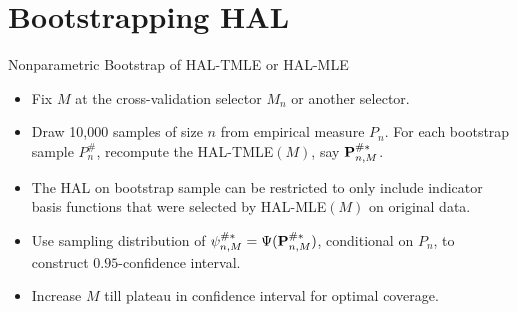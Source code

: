 \documentclass[t]{beamer}
\newlength{\wideitemsep}
\let\olditem\item
\renewcommand{\item}{\setlength{\itemsep}{\wideitemsep}\olditem}
\begin{document}
\section{Bootstrapping HAL}
\begin{frame}{Nonparametric  Bootstrap of HAL-TMLE or HAL-MLE}
\begin{itemize}
\item Fix $M$ at the cross-validation selector $M_n$ or another selector.
\item Draw 10,000 samples of size $n$ from empirical measure $P_n$.
For each bootstrap sample $P_n^{\#}$, recompute the HAL-TMLE$(M)$, say ${\bf P}_{n,M}^{\#*}$.
\item The HAL on bootstrap sample can be restricted to only include indicator basis functions that were selected by HAL-MLE$(M)$ on original data.
\item Use sampling distribution of $\psi_{n,M}^{\#*}=\Psi({\bf P}_{n,M}^{\#*})$, conditional on $P_n$, to construct $0.95$-confidence interval.
\item Increase $M$ till plateau in confidence interval for optimal coverage.
\end{itemize}
\end{frame}
\end{document}
